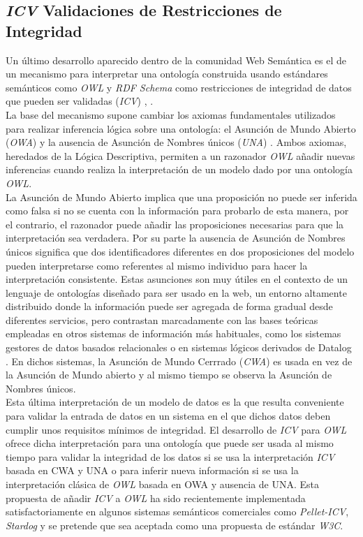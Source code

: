 \subsection{\textit{ICV} Validaciones de Restricciones de Integridad}

Un \'ultimo desarrollo aparecido dentro de la comunidad Web Sem\'antica es el de un mecanismo para interpretar una ontolog\'ia construida usando est\'andares sem\'anticos como \textit{OWL} y \textit{RDF Schema} como restricciones de integridad de datos que pueden ser validadas (\textit{ICV}) \cite{tao2010integrity}, \cite{motik2009bridging}.\\
La base del mecanismo supone cambiar los axiomas fundamentales utilizados para realizar inferencia l\'ogica sobre una ontolog\'ia: el Asunci\'on de Mundo Abierto (\textit{OWA}) y la ausencia de Asunci\'on de Nombres \'unicos (\textit{UNA}) \cite{sirin2008opening}. Ambos axiomas, heredados de la L\'ogica Descriptiva, permiten a un razonador \textit{OWL} a\~nadir nuevas inferencias cuando realiza la interpretaci\'on de un modelo dado por una ontolog\'ia \textit{OWL}.\\

La Asunci\'on de Mundo Abierto implica que una proposici\'on no puede ser inferida como falsa si no se cuenta con la informaci\'on para probarlo de esta manera, por el contrario, el razonador puede a\~nadir las proposiciones necesarias para que la interpretaci\'on sea verdadera. Por su parte la ausencia de Asunci\'on de Nombres \'unicos significa que dos identificadores diferentes en dos proposiciones del modelo pueden interpretarse como referentes al mismo individuo para hacer la interpretaci\'on consistente. Estas asunciones son muy \'utiles en el contexto de un lenguaje de ontolog\'ias dise\~nado para ser usado en la web, un entorno altamente distribuido donde la informaci\'on puede ser agregada de forma gradual desde diferentes servicios, pero contrastan marcadamente con las bases te\'oricas empleadas en otros sistemas de informaci\'on m\'as habituales, como los sistemas gestores de datos basados relacionales o en sistemas l\'ogicos derivados de Datalog \cite{motik2006can}. En dichos sistemas, la Asunci\'on de Mundo Cerrrado (\textit{CWA}) es usada en vez de la Asunci\'on de Mundo abierto y al mismo tiempo se observa la Asunci\'on de Nombres \'unicos.\\
Esta \'ultima interpretaci\'on de un modelo de datos es la que resulta conveniente para validar la entrada de datos en un sistema en el que dichos datos deben cumplir unos requisitos m\'inimos de integridad. El desarrollo de \textit{ICV} para \textit{OWL} ofrece dicha interpretaci\'on para una ontolog\'ia que puede ser usada al mismo tiempo para validar la integridad de los datos si se usa la interpretaci\'on \textit{ICV} basada en CWA y UNA o para inferir nueva informaci\'on si se usa la interpretaci\'on cl\'asica de \textit{OWL} basada en OWA y ausencia de UNA.
Esta propuesta de a\~nadir \textit{ICV} a \textit{OWL} ha sido recientemente implementada satisfactoriamente en algunos sistemas sem\'anticos comerciales como \textit{Pellet-ICV}, \textit{Stardog} y se pretende que sea aceptada como una propuesta de est\'andar \textit{W3C}.

